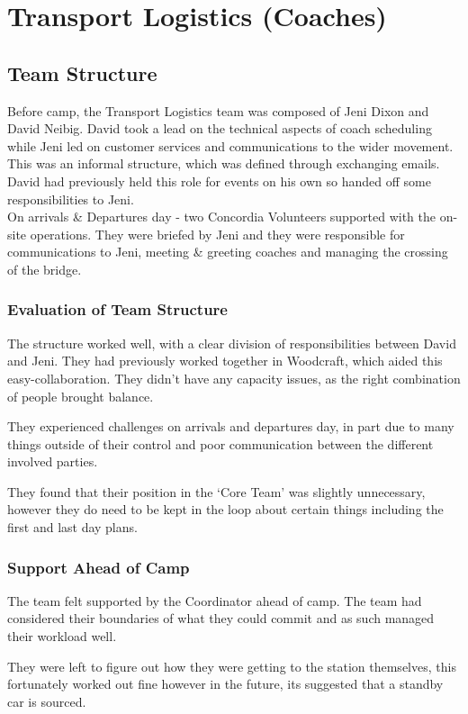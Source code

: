 \chapter{Transport Logistics (Coaches)}
\section{Team Structure}
Before camp, the Transport Logistics team was composed of Jeni Dixon and David Neibig. David took a lead on the technical aspects of coach scheduling while Jeni led on customer services and communications to the wider movement. This was an informal structure, which was defined through exchanging emails. David had previously held this role for events on his own so handed off some responsibilities to Jeni.\\

On arrivals \& Departures day - two Concordia Volunteers supported with the on-site operations. They were briefed by Jeni and they were responsible for communications to Jeni, meeting \& greeting coaches and managing the crossing of the bridge.

\subsection{Evaluation of Team Structure}
The structure worked well, with a clear division of responsibilities between David and Jeni. They had previously worked together in Woodcraft, which aided this easy-collaboration. They didn't have any capacity issues, as the right combination of people brought balance.

They experienced challenges on arrivals and departures day, in part due to many things outside of their control and poor communication between the different involved parties.

They found that their position in the `Core Team' was slightly unnecessary, however they do need to be kept in the loop about certain things including the first and last day plans. 

\subsection{Support Ahead of Camp}
The team felt supported by the Coordinator ahead of camp. The team had considered their boundaries of what they could commit and as such managed their workload well. 

They were left to figure out how they were getting to the station themselves, this fortunately worked out fine however in the future, its suggested that a standby car is sourced.

